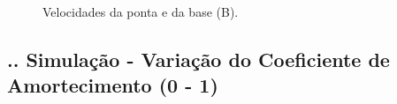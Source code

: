 \documentclass[aspectratio=169]{beamer}
\begin{document}
\begin{frame}
  \frametitle{\insertsubsection}
  \begin{figure}[H]
    \centering
    \caption{Velocidades da ponta e da base (B).}
    \hfill
    \label{fig:1B_vel}
  \end{figure}
\end{frame}

\subsection{\insertsectionnumber .\insertsubsectionnumber . Simulação - Variação do Coeficiente de Amortecimento (0 - 1)}
\end{document}
